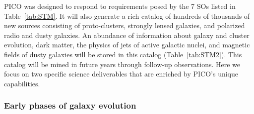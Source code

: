 \documentclass[PICOReport.tex]{subfiles}
\begin{document}
PICO was designed to respond to requirements posed by the 7 \ac{SOs} listed in Table~\ref{tab:STM}. It will also generate a rich catalog of hundreds of thousands of new sources consisting of proto-clusters, strongly lensed galaxies, and polarized radio and dusty galaxies. An abundance of information about galaxy and cluster evolution, dark matter, the physics of jets of active galactic nuclei, and magnetic fields of dusty galaxies will be stored in this catalog (Table~\ref{tab:STM2}). This catalog will be mined in future years through follow-up observations. Here we focus on two specific science deliverables that are enriched by PICO's unique capabilities. %


\subsubsection{Early phases of galaxy evolution}

\end{document}
